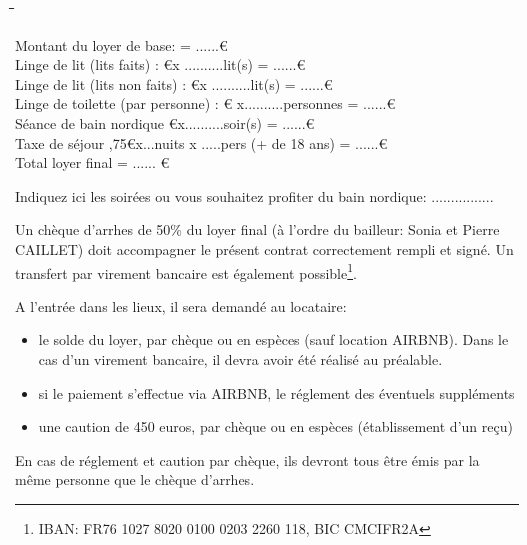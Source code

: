 \documentclass[a4paper,11pt]{article}
\begin{document}
\begin{tabbing}
  
 \hspace{7cm}\=  										\hspace{1cm}\=   	\hspace{6cm}\= 	\hspace{1cm}\= 		\hspace{1cm}\=	\kill


Montant du loyer de base: \>		\>		\>=			\>......\>\euro	   		\\
Linge de lit (lits faits) :			 					\euro		      			\>x ..........lit(s)       				\>=  			\>......\>\euro				\\

Linge de lit (lits non faits) :			 					\euro		      			\>x ..........lit(s)       				\>=  			\>......\>\euro				\\



Linge de toilette (par personne) :					 					\euro      				\> x..........personnes						\>=  			\>......\>\euro				\\

Séance de bain nordique \euro		\>x..........soir(s)		\>=			\>......\>\euro	   		\\


Taxe de séjour ,75\euro		\>x...nuits x .....pers (+ de 18 ans)		\>=			\>......\>\euro	   		\\



Total loyer final    										\>						\>  					\>=  							\>......					\>\euro			\\ 

 \end{tabbing}


\vspace{0.5cm}

Indiquez ici les soirées ou vous souhaitez profiter du bain nordique: ................

\vspace{0.5cm}

  
Un chèque d'arrhes de 50\% du loyer final (à l'ordre du bailleur: Sonia et Pierre CAILLET)  doit accompagner le présent contrat correctement rempli et signé. Un transfert par virement bancaire est également possible\footnote{IBAN: FR76 1027 8020 0100 0203 2260 118, BIC CMCIFR2A}.

\vspace{0.5cm}

A l'entrée dans les lieux, il sera demandé au locataire:
\begin{itemize}
\item le solde du loyer, par chèque ou en espèces (sauf location AIRBNB). Dans le cas d'un virement bancaire, il devra avoir été réalisé au préalable.
\item si le paiement s'effectue via AIRBNB, le réglement des éventuels suppléments
\item une caution de 450 euros, par chèque ou en espèces (établissement d'un reçu)
\end{itemize}
En cas de réglement et caution par chèque, ils devront tous être émis par la même personne que le chèque d'arrhes.
\end{document}

